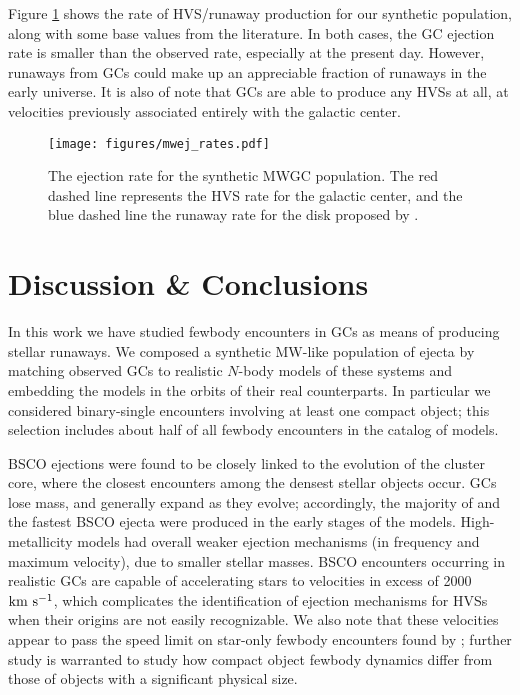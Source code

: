 \documentclass[twocolumn]{aastex631}
\newcommand{\kms}{${\rm km~s^{-1}}$}
\begin{document}
Figure \ref{fig:mwej_rates} shows the rate of HVS/runaway production for our synthetic population, along with some base values from the literature.
In both cases, the GC ejection rate is smaller than the observed rate, especially at the present day.
However, runaways from GCs could make up an appreciable fraction of runaways in the early universe.
It is also of note that GCs are able to produce any HVSs at all, at velocities previously associated entirely with the galactic center.

\begin{figure}
    \begin{centering}
        \texttt{[image: figures/mwej\_rates.pdf]}
        \caption{
            The ejection rate for the synthetic MWGC population.
            The red dashed line represents the HVS rate for the galactic center, and the blue dashed line the runaway rate for the disk proposed by \citep{2015ARA&A..53...15B}.
        }
        \label{fig:mwej_rates}
    \end{centering}
\end{figure}

\section{Discussion \& Conclusions} \label{sec:disccon}

In this work we have studied fewbody encounters in GCs as means of producing stellar runaways.
We composed a synthetic MW-like population of ejecta by matching observed GCs to realistic $N$-body models of these systems and embedding the models in the orbits of their real counterparts.
In particular we considered binary-single encounters involving at least one compact object; this selection includes about half of all fewbody encounters in the catalog of models.

BSCO ejections were found to be closely linked to the evolution of the cluster core, where the closest encounters among the densest stellar objects occur.
GCs lose mass, and generally expand as they evolve; accordingly, the majority of and the fastest BSCO ejecta were produced in the early stages of the models.
High-metallicity models had overall weaker ejection mechanisms (in frequency and maximum velocity), due to smaller stellar masses.
BSCO encounters occurring in realistic GCs are capable of accelerating stars to velocities in excess of 2000 \kms, which complicates the identification of ejection mechanisms for HVSs when their origins are not easily recognizable.
We also note that these velocities appear to pass the speed limit on star-only fewbody encounters found by \citet{1991AJ....101..562L}; further study is warranted to study how compact object fewbody dynamics differ from those of objects with a significant physical size.
\end{document}
